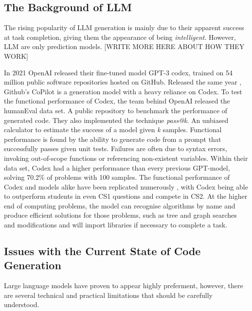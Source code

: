 \documentclass[manuscript,screen,review,sigconf]{acmart}
\begin{document}
\subsection{The Background of LLM}
The rising popularity of LLM generation is mainly due to their apparent success at task completion, giving them the appearance of being \textit{intelligent}. However, LLM are only prediction models. [WRITE MORE HERE ABOUT HOW THEY WORK]



In 2021 OpenAI released their fine-tuned model GPT-3 codex, trained on 54 million public software repositories hosted on GitHub\cite{CodexRelPaper}. Released the same year \cite{GitHub_2021}, Github's CoPilot is a generation model with a heavy reliance on Codex. To test the functional performance of Codex, the team behind OpenAI released the humanEval data set. A public repository to benchmark the performance of generated code. They also implemented the technique \textit{pass@k}. An unbiased calculator to estimate the success of a model given \textit{k} samples. Functional performance is found by the ability to generate code from a prompt that successfully passes given unit tests. Failures are often due to syntax errors, invoking out-of-scope functions or referencing non-existent variables. Within their data set, Codex had a higher performance than every previous GPT-model, solving 70.2\% of problems with 100 samples. The functional performance of Codex and models alike have been replicated numerously \cite{SysEvaOfLLMofCode, PerformanceParsonProblems, CopilotSuggestionsEval, CoPilotForTeaching}, with Codex being able to outperform students in even CS1 questions and compete in CS2\cite{Codex_CS1_CS2_Test}. At the higher end of computing problems, the model can recognise algorithms by name and produce efficient solutions for those problems, such as tree and graph searches and modifications and will import libraries if necessary to complete a task.

\subsection{Issues with the Current State of Code Generation}
 Large language models have proven to appear highly preferment, however, there are several technical and practical limitations that should be carefully understood.
\end{document}
